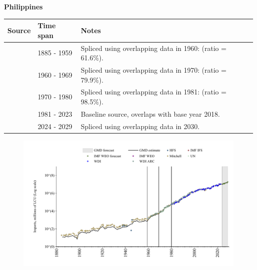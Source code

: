 \documentclass[12pt,a4paper,landscape]{article}
\begin{document}
\begin{adjustbox}{max totalsize={\paperwidth}{\paperheight},center}
\begin{minipage}[t][\textheight][t]{\textwidth}
\vspace*{0.5cm}
{}
\begin{center}
{\Large\bfseries Philippines}
\end{center}
\vspace{0.5cm}
\begin{table}[H]
\centering
\small
\begin{tabular}{|l|l|l|}
\hline
\textbf{Source} & \textbf{Time span} & \textbf{Notes} \\
\hline
\rowcolor{white}\cite{Mitchell}& 1885 - 1959 &Spliced using overlapping data in 1960: (ratio = 61.6\%).\\
\rowcolor{lightgray}\cite{WDI_ARC}& 1960 - 1969 &Spliced using overlapping data in 1970: (ratio = 79.9\%).\\
\rowcolor{white}\cite{UN}& 1970 - 1980 &Spliced using overlapping data in 1981: (ratio = 98.5\%).\\
\rowcolor{lightgray}\cite{WDI}& 1981 - 2023 &Baseline source, overlaps with base year 2018.\\
\rowcolor{white}\cite{IMF_WEO_forecast}& 2024 - 2029 &Spliced using overlapping data in 2030.\\
\hline
\end{tabular}
\end{table}
\begin{figure}[H]
\centering
\includegraphics[width=\textwidth,height=0.6\textheight,keepaspectratio]{graphs/PHL_imports.pdf}
\end{figure}
\end{minipage}
\end{adjustbox}
\end{document}
